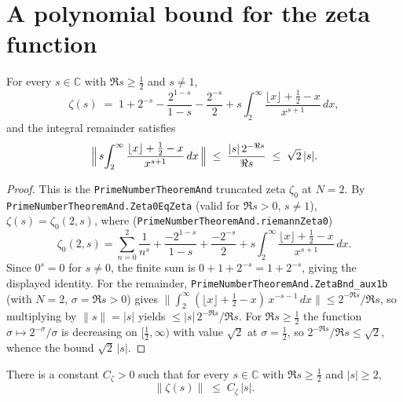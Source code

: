 \section{A polynomial bound for the zeta function}
\label{sec:xo_zeta}

\begin{lemma}[Euler--Maclaurin truncation of $\zeta$ at $N=2$]
\label{lem:xo_zeta_em2}
\leanok
For every $s\in\mathbb C$ with $\Re s\ge\tfrac12$ and $s\neq1$,
\[
  \zeta(s)\;=\;1+2^{-s}-\frac{2^{1-s}}{1-s}-\frac{2^{-s}}2
            +s\int_{2}^{\infty}\frac{\lfloor x\rfloor+\tfrac12-x}{x^{s+1}}\,dx,
\]
and the integral remainder satisfies
\[
  \Bigl\|\,s\!\int_{2}^{\infty}\frac{\lfloor x\rfloor+\tfrac12-x}{x^{s+1}}\,dx\,\Bigr\|
   \;\le\;\frac{|s|\,2^{-\Re s}}{\Re s}\;\le\;\sqrt2\,|s|.
\]
\end{lemma}

\begin{proof}
\leanok
This is the \texttt{PrimeNumberTheoremAnd} truncated zeta $\zeta_0$ at $N=2$. By
\texttt{PrimeNumberTheoremAnd.Zeta0EqZeta} (valid for $\Re s>0$, $s\neq1$),
$\zeta(s)=\zeta_0(2,s)$, where (\texttt{PrimeNumberTheoremAnd.riemannZeta0})
\[
  \zeta_0(2,s)=\sum_{n=0}^{2}\frac1{n^{s}}+\frac{-2^{1-s}}{1-s}+\frac{-2^{-s}}2
   +s\int_{2}^{\infty}\frac{\lfloor x\rfloor+\tfrac12-x}{x^{s+1}}\,dx .
\]
Since $0^{s}=0$ for $s\neq0$, the finite sum is $0+1+2^{-s}=1+2^{-s}$, giving the
displayed identity. For the remainder, \texttt{PrimeNumberTheoremAnd.ZetaBnd\_aux1b}
(with $N=2$, $\sigma=\Re s>0$) gives
$\bigl\|\int_{2}^{\infty}(\lfloor x\rfloor+\tfrac12-x)\,x^{-s-1}\,dx\bigr\|
\le 2^{-\Re s}/\Re s$, so multiplying by $\|s\|=|s|$ yields
$\le|s|\,2^{-\Re s}/\Re s$. For $\Re s\ge\tfrac12$ the function $\sigma\mapsto2^{-\sigma}/\sigma$
is decreasing on $[\tfrac12,\infty)$ with value $\sqrt2$ at $\sigma=\tfrac12$, so
$2^{-\Re s}/\Re s\le\sqrt2$, whence the bound $\sqrt2\,|s|$.
\end{proof}

\begin{lemma}
\label{lem:xo_zeta_poly}
\leanok
{}
There is a constant $C_\zeta>0$ such that for every $s\in\mathbb C$ with $\Re s\ge\tfrac12$
and $|s|\ge2$,
\[
  \|\zeta(s)\|\;\le\;C_\zeta\,|s|.
\]
\end{lemma}

